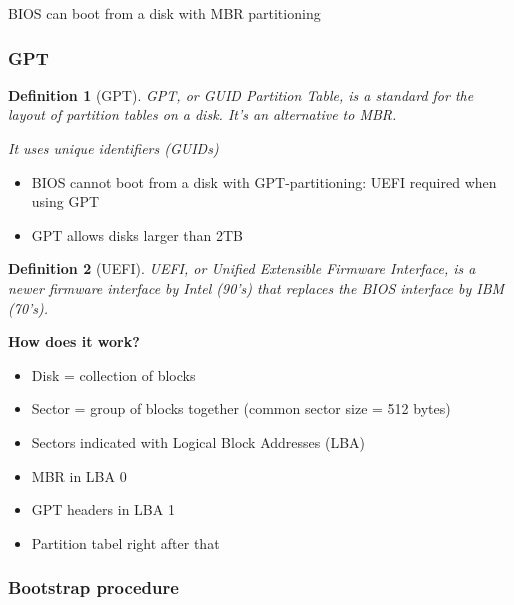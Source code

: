 \documentclass{article}
\newtheorem{theorem}{Definition}[section]
\begin{document}
BIOS can boot from a disk with MBR partitioning

\subsubsection{GPT}

\begin{theorem}[GPT]
GPT, or GUID Partition Table, is a standard for the layout of partition tables on a disk.
It's an alternative to MBR.

It uses unique identifiers (GUIDs) 
\end{theorem}

\begin{itemize}
    \item BIOS cannot boot from a disk with GPT-partitioning: UEFI required when using GPT
    \item GPT allows disks larger than 2TB
\end{itemize}

\begin{theorem}[UEFI]
UEFI, or Unified Extensible Firmware Interface, is a newer firmware interface by Intel (90's) that replaces the BIOS interface by IBM (70's).
\end{theorem}

\textbf{How does it work?}

\begin{itemize}
    \item Disk = collection of blocks
    \item Sector = group of blocks together (common sector size = 512 bytes)
    \item Sectors indicated with Logical Block Addresses (LBA)
    \item MBR in LBA 0
    \item GPT headers in LBA 1
    \item Partition tabel right after that
\end{itemize}


\subsubsection{Bootstrap procedure}
\end{document}
